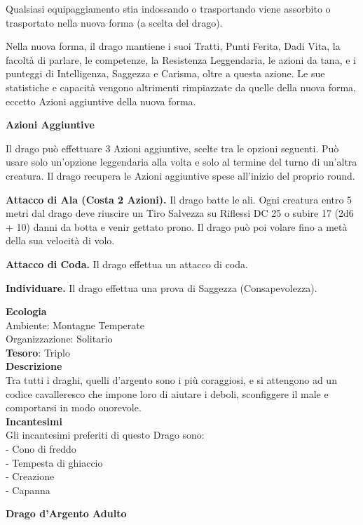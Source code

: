 \begin{multicols}{2}
	Qualsiasi equipaggiamento stia indossando o trasportando viene assorbito o trasportato nella nuova forma (a scelta del drago).

	Nella nuova forma, il drago mantiene i suoi Tratti, Punti Ferita, Dadi Vita, la facoltà di parlare, le competenze, la Resistenza Leggendaria, le azioni da tana, e i punteggi di Intelligenza, Saggezza e Carisma, oltre a questa azione. Le sue statistiche e capacità vengono altrimenti rimpiazzate da quelle della nuova forma, eccetto Azioni aggiuntive della nuova forma.

	\textbf{Azioni Aggiuntive}

	Il drago può effettuare 3 Azioni aggiuntive, scelte tra le opzioni seguenti. Può usare solo un'opzione leggendaria alla volta e solo al termine del turno di un'altra creatura. Il drago recupera le Azioni aggiuntive spese all'inizio del proprio round.

	\textbf{Attacco di Ala (Costa 2 Azioni).} Il drago batte le ali. Ogni creatura entro 5 metri dal drago deve riuscire un Tiro Salvezza su Riflessi DC 25 o subire 17 (2d6 + 10) danni da botta e venir gettato prono. Il drago può poi volare fino a metà della sua velocità di volo.

	\textbf{Attacco di Coda.} Il drago effettua un attacco di coda.

	\textbf{Individuare.} Il drago effettua una prova di Saggezza (Consapevolezza).

	\textbf{Ecologia}\\
	Ambiente: Montagne Temperate\\
	Organizzazione: Solitario\\
	\textbf{Tesoro}: Triplo\\
	\textbf{Descrizione}\\
	Tra tutti i draghi, quelli d'argento sono i più coraggiosi, e si attengono ad un codice cavalleresco che impone loro di aiutare i deboli, sconfiggere il male e comportarsi in modo onorevole.\\
	\textbf{Incantesimi}\\
	Gli incantesimi preferiti di questo Drago sono:\\
	- Cono di freddo\\
	- Tempesta di ghiaccio\\
	- Creazione\\
	- Capanna

	\medskip{}\textbf{Drago d'Argento Adulto}


\end{multicols}
